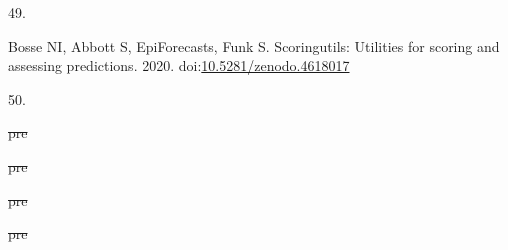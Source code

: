 \documentclass[10pt,letterpaper]{article}
\newlength{\cslhangindent}
\newlength{\csllabelwidth}
\newlength{\cslentryspacingunit} %
\newenvironment{CSLReferences}[2] %
 {%
  \setlength{\parindent}{0pt}
  \ifodd #1
  \let\oldpar\par
  \def\par{\hangindent=\cslhangindent\oldpar}
  \fi
  \setlength{\parskip}{#2\cslentryspacingunit}
 }%
 {}
\newcommand{\CSLLeftMargin}[1]{\parbox[t]{\csllabelwidth}{#1}}
\newcommand{\CSLRightInline}[1]{\parbox[t]{\linewidth - \csllabelwidth}{#1}\break}
\providecommand{\DIFdeltex}[1]{{\protect\color{red}\sout{#1}}}                      %
\providecommand{\DIFdelbegin}{} %
\providecommand{\DIFdelend}{} %
\providecommand{\DIFdel}[1]{\texorpdfstring{\DIFdeltex{#1}}{}} %
\newcommand{\DIFscaledelfig}{0.5}
\newlength{\DIFdelgraphicswidth} %
\newlength{\DIFdelgraphicsheight} %
\newcommand{\DIFdelincludegraphics}[2][]{%
\sbox{\DIFdelgraphicsbox}{\DIFOincludegraphics[#1]{#2}}%
\settoboxwidth{\DIFdelgraphicswidth}{\DIFdelgraphicsbox} %
\settoboxtotalheight{\DIFdelgraphicsheight}{\DIFdelgraphicsbox} %
\scalebox{\DIFscaledelfig}{%
\parbox[b]{\DIFdelgraphicswidth}{\usebox{\DIFdelgraphicsbox}\\[-\baselineskip] \rule{\DIFdelgraphicswidth}{0em}}\llap{\resizebox{\DIFdelgraphicswidth}{\DIFdelgraphicsheight}{%
\setlength{\unitlength}{\DIFdelgraphicswidth}%
\begin{picture}(1,1)%
\thicklines\linethickness{2pt} %
{\color[rgb]{1,0,0}\put(0,0){\framebox(1,1){}}}%
{\color[rgb]{1,0,0}\put(0,0){\line( 1,1){1}}}%
{\color[rgb]{1,0,0}\put(0,1){\line(1,-1){1}}}%
\end{picture}%
}\hspace*{3pt}}} %
} %
\DeclareRobustCommand{\DIFdelbegin}{\DIFOdelbegin \let\includegraphics\DIFdelincludegraphics} %
\DeclareRobustCommand{\DIFdelend}{\DIFOaddend \let\includegraphics\DIFOincludegraphics} %
\begin{document}
\begin{CSLReferences}{0}{0}
\leavevmode{}%
\CSLLeftMargin{49. }%
\CSLRightInline{Bosse NI, Abbott S, EpiForecasts, Funk S. Scoringutils:
Utilities for scoring and assessing predictions. 2020.
doi:\href{https://doi.org/10.5281/zenodo.4618017}{10.5281/zenodo.4618017}}

\leavevmode{}%
\CSLLeftMargin{50. }\DIFdelbegin %

\DIFdel{pre}%
\DIFdelend %
\DIFdelbegin %

\DIFdel{pre}%

\DIFdel{pre}%

\DIFdel{pre}%


\end{CSLReferences}
\end{document}
